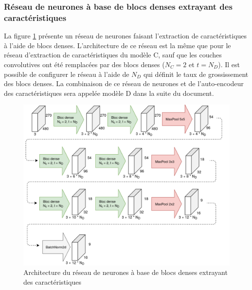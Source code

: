 \subsubsection{Réseau de neurones à base de blocs denses extrayant des caractéristiques}
    La figure \ref{fig:architecture_small_cnn_dense_bloc} présente un réseau de neurones faisant l'extraction de caractéristiques à l'aide de blocs denses. L'architecture de ce réseau est la même que pour le réseau d'extraction de caractéristiques du modèle C, sauf que les couches convolutives ont été remplacées par des blocs denses (\(N_C = 2\) et  \(t = N_D\)). Il est possible de configurer le réseau à l'aide de \(N_D\) qui définit le taux de grossissement des blocs denses. La combinaison de ce réseau de neurones et de l'auto-encodeur des caractéristiques sera appelée modèle D dans la suite du document.
    \begin{figure}
        \centering
        \includegraphics[width=16.6cm]{images/Architecture_SmallCnnWithAutoencoderDenseBlocks.png}
        \caption{Architecture du réseau de neurones à base de blocs denses extrayant des caractéristiques}
        \label{fig:architecture_small_cnn_dense_bloc}
    \end{figure}

